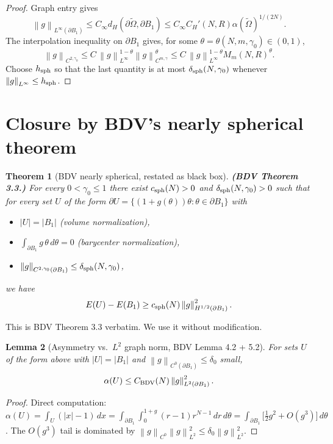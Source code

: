 \documentclass[11pt]{article}
\newtheorem{theorem}{Theorem}
\newtheorem{lemma}[theorem]{Lemma}
\theoremstyle{definition}
\newcommand{\norm}[1]{\left\|#1\right\|}
\newcommand{\abs}[1]{\left|#1\right|}
\renewcommand{\d}{\,d}
\begin{document}
\begin{proof}
Graph entry gives
\[
\norm{g}_{L^\infty(\partial B_1)}
\le C_\infty d_H(\partial\widetilde\Omega,\partial B_1)
\le C_\infty C_H'(N,R)\alpha(\widetilde\Omega)^{1/(2N)}.
\]
The interpolation inequality on $\partial B_1$ gives, for some
$\theta=\theta(N,m,\gamma_0)\in(0,1)$,
\[
\norm{g}_{C^{2,\gamma_0}}
\le C\,\norm{g}_{L^\infty}^{1-\theta}
       \norm{g}_{C^{m,\gamma}}^\theta
\le C\,\norm{g}_{L^\infty}^{1-\theta}M_m(N,R)^\theta.
\]
Choose $h_{\rm sph}$ so that the last quantity is at most
$\delta_{\rm sph}(N,\gamma_0)$ whenever $\norm{g}_{L^\infty}\le h_{\rm sph}$.
\end{proof}

\section{Closure by BDV's nearly spherical theorem}\label{sec:closure}

\begin{theorem}[BDV nearly spherical, restated as black box]\label{thm:nearlysph}
\textbf{(BDV Theorem 3.3.)} For every $0<\gamma_0\le1$ there exist
$c_{\rm sph}(N)>0$ and $\delta_{\rm sph}(N,\gamma_0)>0$ such that for every set $U$ of the form
$\partial U=\{(1+g(\theta))\theta:\theta\in\partial B_1\}$ with
\begin{itemize}
\item $\abs U=\abs{B_1}$ (volume normalization),
\item $\int_{\partial B_1}g\,\theta\d\theta=0$ (barycenter normalization),
\item $\norm{g}_{C^{2,\gamma_0}(\partial B_1)}\le\delta_{\rm sph}(N,\gamma_0)$,
\end{itemize}
we have
\[
E(U)-E(B_1)\ge c_{\rm sph}(N)\norm{g}_{H^{1/2}(\partial B_1)}^2.
\]
\end{theorem}

This is BDV Theorem 3.3 verbatim. We use it without modification.

\begin{lemma}[Asymmetry vs.\ $L^2$ graph norm, BDV Lemma 4.2 + 5.2]\label{lem:asymL2}
For sets $U$ of the form above with $\abs U=\abs{B_1}$ and
$\norm{g}_{C^0(\partial B_1)}\le\delta_0$ small,
\[
\alpha(U)\le C_{\rm BDV}(N)\norm{g}_{L^2(\partial B_1)}^2.
\]
\end{lemma}

\begin{proof}
Direct computation: $\alpha(U)=\int_U(\abs{x}-1)\d x=
\int_{\partial B_1}\int_0^{1+g}(r-1)r^{N-1}\d r\d\theta
=\int_{\partial B_1}\bigl[\tfrac12 g^2+O(g^3)\bigr]\d\theta$.
The $O(g^3)$ tail is dominated by $\norm{g}_{C^0}\norm{g}_{L^2}^2\le\delta_0\norm{g}_{L^2}^2$.
\end{proof}
\end{document}
